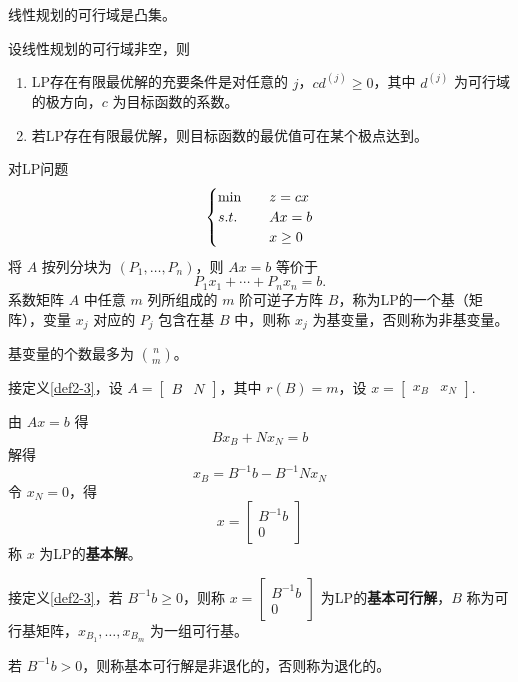 \begin{theorem}
    线性规划的可行域是凸集。
\end{theorem}

\begin{theorem}
    设线性规划的可行域非空，则
    \begin{enumerate}
        \item LP存在有限最优解的充要条件是对任意的 $j$，$cd^{(j)} \ge 0$，其中 $d^{(j)}$ 为可行域的极方向，$c$ 为目标函数的系数。
        \item 若LP存在有限最优解，则目标函数的最优值可在某个极点达到。
    \end{enumerate}
\end{theorem}

\begin{definition}[基矩阵和基变量]\label{def2-3}
    对LP问题
    \[
        \begin{cases}
            \min \quad &z = cx\\
            s.t. \quad &Ax = b\\
            &x \ge 0
        \end{cases}  
    \]
    将 $A$ 按列分块为 $(P_1, \dots, P_n)$，则 $Ax = b$ 等价于 
    \[
        P_1x_1 + \cdots + P_nx_n = b.
    \]
    系数矩阵 $A$ 中任意 $m$ 列所组成的 $m$ 阶可逆子方阵 $B$，称为LP的一个基（矩阵），变量 $x_j$ 对应的 $P_j$ 包含在基 $B$ 中，则称 $x_j$ 为基变量，否则称为非基变量。

    基变量的个数最多为 $\binom{n}{m}$。
\end{definition}

\begin{definition}[基本解]\label{def2-4}
    接定义\ref{def2-3}，设 $A = \begin{bmatrix} B & N \end{bmatrix}$，其中 $r(B) = m$，设 $x = \begin{bmatrix}x_B & x_N\end{bmatrix}$.

    由 $Ax = b$ 得
    \[
        Bx_B + Nx_N = b  
    \]
    解得
    \[
        x_B = B^{-1}b - B^{-1}Nx_N    
    \]
    令 $x_N = 0$，得
    \[
        x = \begin{bmatrix}
            B^{-1}b\\
            0
        \end{bmatrix}    
    \]
    称 $x$ 为LP的\textbf{基本解}。
\end{definition}

\begin{definition}[基本可行解]
    接定义\ref{def2-3}，若 $B^{-1}b \ge 0$，则称 $x = \begin{bmatrix}
        B^{-1}b\\
        0
    \end{bmatrix}$ 为LP的\textbf{基本可行解}，$B$ 称为可行基矩阵，$x_{B_1}, \dots, x_{B_m}$ 为一组可行基。

    若 $B^{-1}b > 0$，则称基本可行解是非退化的，否则称为退化的。
\end{definition}


